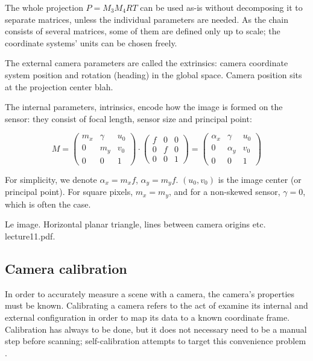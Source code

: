 The whole projection $P = M_3 M_4 R T$ can be used as-is without decomposing it to separate matrices, unless the individual parameters are needed. As the chain consists of several matrices, some of them are defined only up to scale; the coordinate systems' units can be chosen freely.

The external camera parameters are called the extrinsics: camera coordinate system position and rotation (heading) in the global space.
Camera position sits at the projection center blah.

The internal parameters, intrinsics, encode how the image is formed on the sensor: they consist of focal length, sensor size and principal point:

\begin{equation}
	M =
	\begin{pmatrix}
		m_x & \gamma & u_0\\
		0   &    m_y & v_0\\
		0   &        0 & 1
	\end{pmatrix}
\cdot
	\begin{pmatrix}
		f & 0 & 0\\
		0 & f & 0\\
		0 & 0 & 1
	\end{pmatrix}
	=
	\begin{pmatrix}
		\alpha_x & \gamma   & u_0\\
		0        & \alpha_y & v_0\\
		0        & 0        & 1
	\end{pmatrix}
\end{equation}

For simplicity, we denote $\alpha_x = m_x f$, $\alpha_y = m_y f$. $(u_0, v_0)$ is the image center (or principal point). For square pixels, $m_x = m_y$, and for a non-skewed sensor, $\gamma = 0$, which is often the case.

Le image. Horizontal planar triangle, lines between camera origins etc. lecture11.pdf.

\subsection{Camera calibration}

In order to accurately measure a scene with a camera, the camera's properties must be known.
Calibrating a camera refers to the act of examine its internal and external configuration in order to map its data to a known coordinate frame.
Calibration has always to be done, but it does not necessary need to be a manual step before scanning; self-calibration attempts to target this convenience problem \cite{pollefeys1999hand, ETC}.

